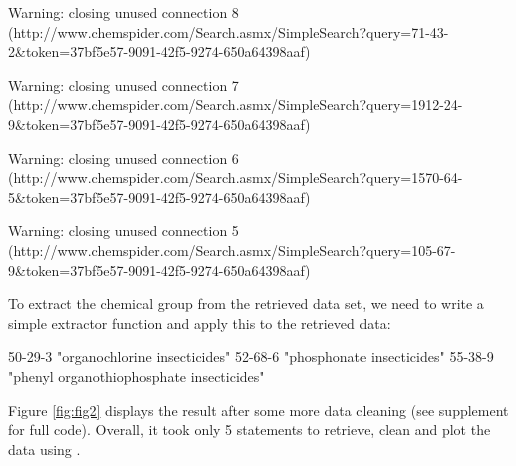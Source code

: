 \documentclass[article, shortnames]{jss}\usepackage[]{graphicx}\usepackage[]{color}
\begin{document}
\begin{CodeChunk}
\begin{CodeOutput}
\end{CodeOutput}
\begin{CodeOutput}
Warning: closing unused connection 8 (http://www.chemspider.com/Search.asmx/SimpleSearch?query=71-43-2&token=37bf5e57-9091-42f5-9274-650a64398aaf)
\end{CodeOutput}
\begin{CodeOutput}
Warning: closing unused connection 7 (http://www.chemspider.com/Search.asmx/SimpleSearch?query=1912-24-9&token=37bf5e57-9091-42f5-9274-650a64398aaf)
\end{CodeOutput}
\begin{CodeOutput}
Warning: closing unused connection 6 (http://www.chemspider.com/Search.asmx/SimpleSearch?query=1570-64-5&token=37bf5e57-9091-42f5-9274-650a64398aaf)
\end{CodeOutput}
\begin{CodeOutput}
Warning: closing unused connection 5 (http://www.chemspider.com/Search.asmx/SimpleSearch?query=105-67-9&token=37bf5e57-9091-42f5-9274-650a64398aaf)
\end{CodeOutput}
\end{CodeChunk}

To extract the chemical group from the retrieved data set, we need to write a simple extractor function and apply this to the retrieved data:

\begin{CodeChunk}
\begin{CodeOutput}
                                  50-29-3 
            "organochlorine insecticides" 
                                  52-68-6 
               "phosphonate insecticides" 
                                  55-38-9 
"phenyl organothiophosphate insecticides" 
\end{CodeOutput}
\end{CodeChunk}

Figure \ref{fig:fig2} displays the result after some more data cleaning (see supplement for full code).
Overall, it took only 5  statements to retrieve, clean and plot the data using  \citep{ggplot2}.
\end{document}
